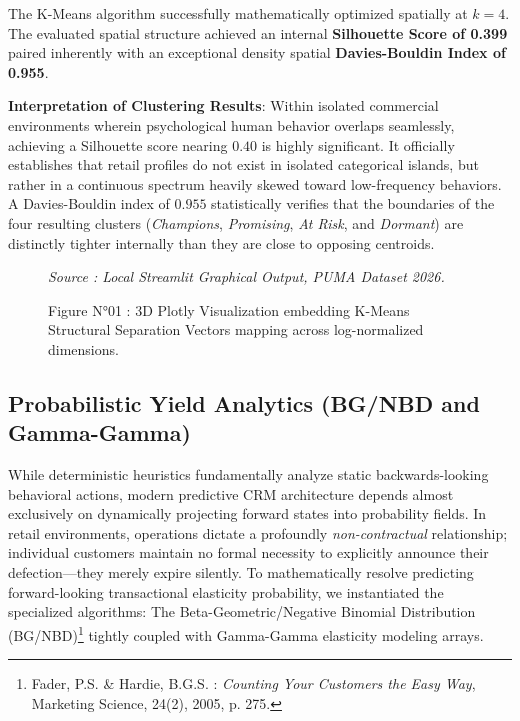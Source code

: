 \documentclass[12pt,a4paper]{report}
\begin{document}
The K-Means algorithm successfully mathematically optimized spatially at \textbf{$k=4$}. The evaluated spatial structure achieved an internal \textbf{Silhouette Score of 0.399} paired inherently with an exceptional density spatial \textbf{Davies-Bouldin Index of 0.955}. 

\textbf{Interpretation of Clustering Results}: Within isolated commercial environments wherein psychological human behavior overlaps seamlessly, achieving a Silhouette score nearing $0.40$ is highly significant. It officially establishes that retail profiles do not exist in isolated categorical islands, but rather in a continuous spectrum heavily skewed toward low-frequency behaviors. A Davies-Bouldin index of $0.955$ statistically verifies that the boundaries of the four resulting clusters (\textit{Champions}, \textit{Promising}, \textit{At Risk}, and \textit{Dormant}) are distinctly tighter internally than they are close to opposing centroids.

\begin{figure}[H]
    \centering
    \vspace{4cm} 
    \caption{Figure N°01 : 3D Plotly Visualization embedding K-Means Structural Separation Vectors mapping across log-normalized dimensions.}
    \vspace{0.2cm}
    \footnotesize{\textit{Source : Local Streamlit Graphical Output, PUMA Dataset 2026.}}
    \label{fig:kmeans_3d}
\end{figure}

\subsection{Probabilistic Yield Analytics (BG/NBD and Gamma-Gamma)}
While deterministic heuristics fundamentally analyze static backwards-looking behavioral actions, modern predictive CRM architecture depends almost exclusively on dynamically projecting forward states into probability fields. In retail environments, operations dictate a profoundly \textit{non-contractual} relationship; individual customers maintain no formal necessity to explicitly announce their defection—they merely expire silently. To mathematically resolve predicting forward-looking transactional elasticity probability, we instantiated the specialized algorithms: The Beta-Geometric/Negative Binomial Distribution (BG/NBD)\footnote{Fader, P.S. \& Hardie, B.G.S. : \textit{Counting Your Customers the Easy Way}, Marketing Science, 24(2), 2005, p. 275.} tightly coupled with Gamma-Gamma elasticity modeling arrays.
\end{document}
